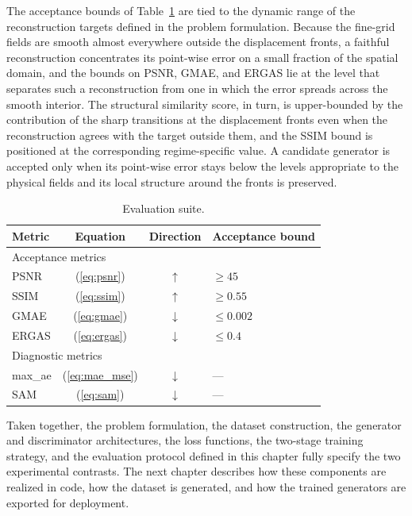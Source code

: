 The acceptance bounds of Table~\ref{tab:metric_suite} are tied to the dynamic range of the reconstruction targets defined in the problem formulation. Because the fine-grid fields are smooth almost everywhere outside the displacement fronts, a faithful reconstruction concentrates its point-wise error on a small fraction of the spatial domain, and the bounds on PSNR, GMAE, and ERGAS lie at the level that separates such a reconstruction from one in which the error spreads across the smooth interior. The structural similarity score, in turn, is upper-bounded by the contribution of the sharp transitions at the displacement fronts even when the reconstruction agrees with the target outside them, and the SSIM bound is positioned at the corresponding regime-specific value. A candidate generator is accepted only when its point-wise error stays below the levels appropriate to the physical fields and its local structure around the fronts is preserved.

\begin{table}[ht]
\centering
\caption{Evaluation suite.}
\label{tab:metric_suite}
\small
\begin{tabular}{l c c l}
\toprule
Metric & Equation & Direction & Acceptance bound \\
\midrule
\multicolumn{4}{l}{Acceptance metrics} \\
\midrule
PSNR    & (\ref{eq:psnr})  & $\uparrow$   & $\geq 45$    \\
SSIM    & (\ref{eq:ssim})  & $\uparrow$   & $\geq 0.55$  \\
GMAE    & (\ref{eq:gmae})  & $\downarrow$ & $\leq 0.002$ \\
ERGAS   & (\ref{eq:ergas}) & $\downarrow$ & $\leq 0.4$   \\
\midrule
\multicolumn{4}{l}{Diagnostic metrics} \\
\midrule
max\_ae & (\ref{eq:mae_mse}) & $\downarrow$ & --- \\
SAM     & (\ref{eq:sam})     & $\downarrow$ & --- \\
\bottomrule
\end{tabular}
\end{table}

Taken together, the problem formulation, the dataset construction, the generator and discriminator architectures, the loss functions, the two-stage training strategy, and the evaluation protocol defined in this chapter fully specify the two experimental contrasts. The next chapter describes how these components are realized in code, how the dataset is generated, and how the trained generators are exported for deployment.
